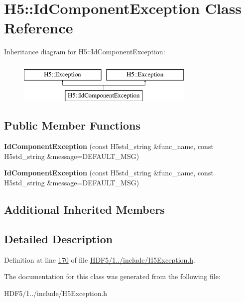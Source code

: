 \hypertarget{class_h5_1_1_id_component_exception}{}\section{H5\+:\+:Id\+Component\+Exception Class Reference}
\label{class_h5_1_1_id_component_exception}
Inheritance diagram for H5\+:\+:Id\+Component\+Exception\+:\begin{figure}[H]
\begin{center}
\leavevmode
\includegraphics[height=2.000000cm]{class_h5_1_1_id_component_exception}
\end{center}
\end{figure}
\subsection*{Public Member Functions}
\begin{DoxyCompactItemize}
\item 
\mbox{\label{class_h5_1_1_id_component_exception_a55e4b5b7053de93986eb35cef03190fd}} 
{\bfseries Id\+Component\+Exception} (const H5std\+\_\+string \&func\+\_\+name, const H5std\+\_\+string \&message=D\+E\+F\+A\+U\+L\+T\+\_\+\+M\+SG)
\item 
\mbox{\label{class_h5_1_1_id_component_exception_a55e4b5b7053de93986eb35cef03190fd}} 
{\bfseries Id\+Component\+Exception} (const H5std\+\_\+string \&func\+\_\+name, const H5std\+\_\+string \&message=D\+E\+F\+A\+U\+L\+T\+\_\+\+M\+SG)
\end{DoxyCompactItemize}
\subsection*{Additional Inherited Members}


\subsection{Detailed Description}


Definition at line \hyperlink{_h_d_f5_21_810_81_2include_2_h5_exception_8h_source_l00170}{170} of file \hyperlink{_h_d_f5_21_810_81_2include_2_h5_exception_8h_source}{H\+D\+F5/1../include/\+H5\+Exception.\+h}.



The documentation for this class was generated from the following file\+:\begin{DoxyCompactItemize}
\item 
H\+D\+F5/1../include/\+H5\+Exception.\+h\end{DoxyCompactItemize}
